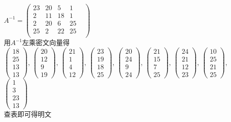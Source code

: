 \documentclass[12pt]{article}
\begin{document}
\begin{enumerate}
$A^{-1}=
\begin{pmatrix}
23&   20&    5&    1&\\
2&   11&   18&    1&\\
2&   20&    6&   25&\\
25&    2&   22&   25&\\
\end{pmatrix}
$\\
用$A^{-1}$左乘密文向量得\\
$\begin{pmatrix}18\\25\\13\\13\end{pmatrix}$,
$\begin{pmatrix}20\\12\\9\\19\end{pmatrix}$,
$\begin{pmatrix}21\\1\\4\\12\end{pmatrix}$,
$\begin{pmatrix}23\\19\\18\\25\end{pmatrix}$,
$\begin{pmatrix}20\\24\\9\\24\end{pmatrix}$,
$\begin{pmatrix}21\\15\\7\\25\end{pmatrix}$,
$\begin{pmatrix}24\\21\\12\\23\end{pmatrix}$,
$\begin{pmatrix}10\\25\\21\\25\end{pmatrix}$,
$\begin{pmatrix}1\\3\\23\\13\end{pmatrix}$\\
查表即可得明文


\end{enumerate}
\end{document}

